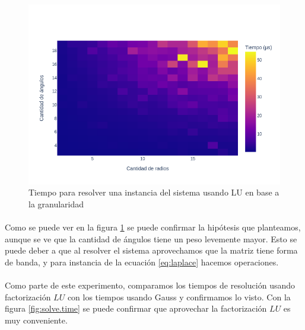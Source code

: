 \documentclass[12pt]{article}
\begin{document}
\begin{figure}[H]
	\centering
	\includegraphics[scale=0.5]{simple.1.granularity.heatmap}
	\caption{Tiempo para resolver una instancia del sistema usando LU en base a la granularidad}
	\label{fig:granularity.heatmap}
\end{figure}

\paragraph{} Como se puede ver en la figura \ref{fig:granularity.heatmap} se puede confirmar la hipótesis que planteamos, aunque se ve que la cantidad de ángulos tiene un peso levemente mayor. Esto se puede deber a que al resolver el sistema aprovechamos que la matriz tiene forma de banda, y para instancia de la ecuación \ref{eq:laplace} hacemos  operaciones.

\paragraph{} Como parte de este experimento, comparamos los tiempos de resolución usando factorización \(LU\) con los tiempos usando Gauss y confirmamos lo visto. Con la figura \ref{fig:solve.time} se puede confirmar que aprovechar la factorización \(LU\) es muy conveniente.
\end{document}

